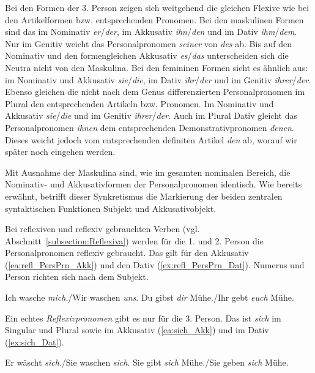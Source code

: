 Bei den Formen der 3. Person zeigen sich weitgehend die gleichen Flexive wie bei den Artikelformen bzw. entsprechenden Pronomen. Bei den maskulinen Formen sind das im Nominativ \textit{er}/\textit{der}, im Akkusativ \textit{ihn}/\textit{den} und im Dativ \textit{ihm}/\textit{dem}. Nur im Genitiv weicht das Personalpronomen \textit{seiner} von \textit{des} ab. Bis auf den Nominativ und den formengleichen Akkusativ \textit{es}/\textit{das} unterscheiden sich die Neutra nicht von den Maskulina. Bei den femininen Formen sieht es ähnlich aus: im Nominativ und Akkusativ \textit{sie}/\textit{die}, im Dativ \textit{ihr}/\textit{der} und im Genitiv \textit{ihrer}/\textit{der}. Ebenso gleichen die nicht nach dem Genus differenzierten Personalpronomen im Plural den entsprechenden Artikeln bzw. Pronomen. Im Nominativ und Akkusativ \textit{sie}/\textit{die} und im Genitiv \textit{ihrer}/\textit{der}. Auch im Plural Dativ gleicht das Personalpronomen \textit{ihnen} dem entsprechenden Demonstrativpronomen \textit{denen}. Dieses weicht jedoch vom entsprechenden definiten Artikel \textit{den} ab, worauf wir später noch eingehen werden.    

Mit Ausnahme der Maskulina sind, wie im gesamten nominalen Bereich, die Nominativ- und Akkusativformen der Personalpronomen identisch. Wie bereits erwähnt, betrifft dieser Synkretismus die Markierung der beiden zentralen syntaktischen Funktionen Subjekt und Akkusativobjekt.

Bei reflexiven und reflexiv gebrauchten Verben (vgl. Abschnitt~\ref{subsection:Reflexiva}) werden für die 1. und 2. Person die Personalpronomen reflexiv gebraucht. Das gilt für den Akkusativ (\ref{ea:refl_PersPrn_Akk}) und den Dativ (\ref{ex:refl_PersPrn_Dat}). Numerus und Person richten sich nach dem Subjekt. 

\ea \label{ea:refl_PersPrn}
\ea \label{ea:refl_PersPrn_Akk} Ich wasche \textit{mich}./Wir waschen \textit{uns}.
\ex \label{ex:refl_PersPrn_Dat} Du gibst \textit{dir} Mühe./Ihr gebt \textit{euch} Mühe.
\z 
\z 

Ein echtes \textit{Reflexivpronomen} gibt es nur für die 3. Person. Das ist \textit{sich} im Singular und Plural sowie im Akkusativ (\ref{ea:sich_Akk}) und im Dativ (\ref{ex:sich_Dat}).

\ea \label{ea:Refl_Prn_sich}
\ea \label{ea:sich_Akk} Er wäscht \textit{sich}./Sie waschen \textit{sich}.
\ex \label{ex:sich_Dat} Sie gibt \textit{sich} Mühe./Sie geben \textit{sich} Mühe.
\z 
\z 



